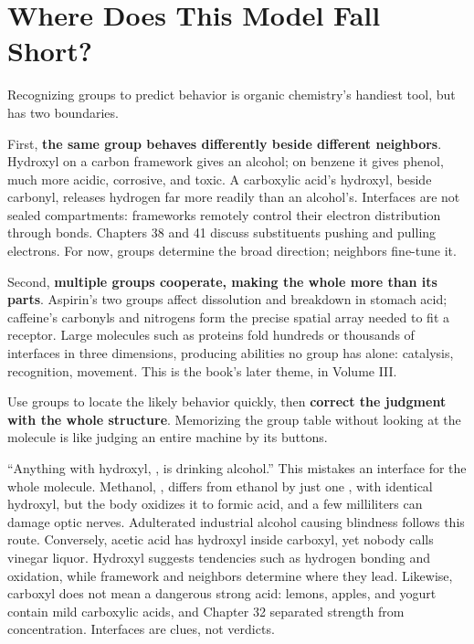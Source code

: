 \section{Where Does This Model Fall Short?}

Recognizing groups to predict behavior is organic chemistry's handiest tool, but has two boundaries.

First, \textbf{the same group behaves differently beside different neighbors}. Hydroxyl on a carbon framework gives an alcohol; on benzene it gives phenol, much more acidic, corrosive, and toxic. A carboxylic acid's hydroxyl, beside carbonyl, releases hydrogen far more readily than an alcohol's. Interfaces are not sealed compartments: frameworks remotely control their electron distribution through bonds. Chapters 38 and 41 discuss substituents pushing and pulling electrons. For now, groups determine the broad direction; neighbors fine-tune it.

Second, \textbf{multiple groups cooperate, making the whole more than its parts}. Aspirin's two groups affect dissolution and breakdown in stomach acid; caffeine's carbonyls and nitrogens form the precise spatial array needed to fit a receptor. Large molecules such as proteins fold hundreds or thousands of interfaces in three dimensions, producing abilities no group has alone: catalysis, recognition, movement. This is the book's later theme, in Volume III.

Use groups to locate the likely behavior quickly, then \textbf{correct the judgment with the whole structure}. Memorizing the group table without looking at the molecule is like judging an entire machine by its buttons.

\begin{wuqu}
``Anything with hydroxyl, , is drinking alcohol.'' This mistakes an interface for the whole molecule. Methanol, , differs from ethanol by just one , with identical hydroxyl, but the body oxidizes it to formic acid, and a few milliliters can damage optic nerves. Adulterated industrial alcohol causing blindness follows this route. Conversely, acetic acid has hydroxyl inside carboxyl, yet nobody calls vinegar liquor. Hydroxyl suggests tendencies such as hydrogen bonding and oxidation, while framework and neighbors determine where they lead. Likewise, carboxyl does not mean a dangerous strong acid: lemons, apples, and yogurt contain mild carboxylic acids, and Chapter 32 separated strength from concentration. Interfaces are clues, not verdicts.
\end{wuqu}

